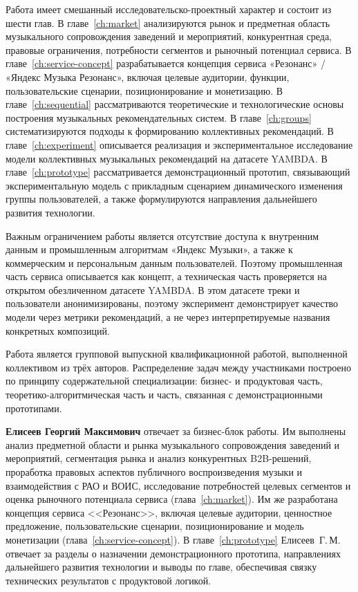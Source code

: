 Работа имеет смешанный исследовательско-проектный характер и состоит из шести глав. В главе~\ref{ch:market} анализируются рынок и предметная область музыкального сопровождения заведений и мероприятий, конкурентная среда, правовые ограничения, потребности сегментов и рыночный потенциал сервиса. В главе~\ref{ch:service-concept} разрабатывается концепция сервиса «Резонанс» / «Яндекс Музыка Резонанс», включая целевые аудитории, функции, пользовательские сценарии, позиционирование и монетизацию. В главе~\ref{ch:sequential} рассматриваются теоретические и технологические основы построения музыкальных рекомендательных систем. В главе~\ref{ch:groups} систематизируются подходы к формированию коллективных рекомендаций. В главе~\ref{ch:experiment} описывается реализация и экспериментальное исследование модели коллективных музыкальных рекомендаций на датасете YAMBDA. В главе~\ref{ch:prototype} рассматривается демонстрационный прототип, связывающий экспериментальную модель с прикладным сценарием динамического изменения группы пользователей, а также формулируются направления дальнейшего развития технологии.

Важным ограничением работы является отсутствие доступа к внутренним данным и промышленным алгоритмам «Яндекс Музыки», а также к коммерческим и персональным данным пользователей. Поэтому промышленная часть сервиса описывается как концепт, а техническая часть проверяется на открытом обезличенном датасете YAMBDA. В этом датасете треки и пользователи анонимизированы, поэтому эксперимент демонстрирует качество модели через метрики рекомендаций, а не через интерпретируемые названия конкретных композиций.

Работа является групповой выпускной квалификационной работой, выполненной коллективом из трёх авторов. Распределение задач между участниками построено по принципу содержательной специализации: бизнес- и продуктовая часть, теоретико-алгоритмическая часть и часть, связанная с демонстрационными прототипами.

\textbf{Елисеев Георгий Максимович} отвечает за бизнес-блок работы. Им выполнены анализ предметной области и рынка музыкального сопровождения заведений и мероприятий, сегментация рынка и анализ конкурентных B2B-решений, проработка правовых аспектов публичного воспроизведения музыки и взаимодействия с РАО и ВОИС, исследование потребностей целевых сегментов и оценка рыночного потенциала сервиса (глава~\ref{ch:market}). Им же разработана концепция сервиса <<Резонанс>>, включая целевые аудитории, ценностное предложение, пользовательские сценарии, позиционирование и модель монетизации (глава~\ref{ch:service-concept}). В главе~\ref{ch:prototype} Елисеев~Г.\,М. отвечает за разделы о назначении демонстрационного прототипа, направлениях дальнейшего развития технологии и выводы по главе, обеспечивая связку технических результатов с продуктовой логикой.

